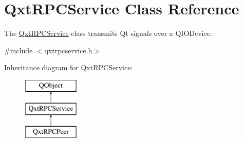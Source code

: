 \hypertarget{class_qxt_r_p_c_service}{\section{Qxt\-R\-P\-C\-Service Class Reference}
\label{class_qxt_r_p_c_service}
}


The \hyperlink{class_qxt_r_p_c_service}{Qxt\-R\-P\-C\-Service} class transmits Qt signals over a Q\-I\-O\-Device.  




{\ttfamily \#include $<$qxtrpcservice.\-h$>$}

Inheritance diagram for Qxt\-R\-P\-C\-Service\-:\begin{figure}[H]
\begin{center}
\leavevmode
\includegraphics[height=3.000000cm]{class_qxt_r_p_c_service}
\end{center}
\end{figure}
